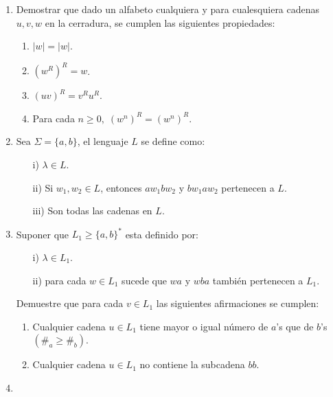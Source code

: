 \documentclass{article}
\begin{document}
\begin{enumerate}
\begin{proof}
\begin{enumerate}
\begin{eqnarray*}
        &=& |a \cdot w| + |w_{2}|
        \hspace*{0.8cm} \text{Para $u$ cadena y $b$ símbolo, se tiene que } |b \cdot u| = 1 + |u|.\\
      \end{eqnarray*}
      \hspace*{4.5cm} $\therefore \hspace*{0.5cm} |vw| = |v| + |w|$
    \end{enumerate}
  \end{proof}
\item Demostrar que dado un alfabeto cualquiera y para cualesquiera cadenas $u, v, w$ en
  la cerradura, se cumplen las siguientes propiedades:
  \begin{enumerate}
  \item $|w| = |w|$.
  \item $\left(w^{R}\right)^{R} = w$.
  \item $(uv)^{R} = v^R u^R$.
  \item Para cada $n \geq 0,\; \left(w^{n}\right)^{R} = \left(w^{n}\right)^{R}$.
  \end{enumerate}
\item Sea $\Sigma = \{a, b\}$, el lenguaje $L$ se define como:
  \begin{enumerate}
  \item[i)] $\lambda \in L$.
  \item[ii)] Si $w_1, w_2 \in L$, entonces $aw_1bw_2$ y $bw_1aw_2$ pertenecen a $L$.
  \item[iii)] Son todas las cadenas en $L$.
  \end{enumerate}
\item Suponer que $L_1 \geq \{a,b\}^{*}$ esta definido por:
  \begin{enumerate}
  \item[i)] $\lambda \in L_1$.
  \item[ii)]  para cada $w \in L_1$ sucede que $wa$ y $wba$ también pertenecen a $L_1$.
  \end{enumerate}
  Demuestre que para cada $v \in L_1$ las siguientes afirmaciones se cumplen:
  \begin{enumerate}
  \item Cualquier cadena $u \in L_1$ tiene mayor o igual número de $a$'s que de
    $b$'s $\left(\#_{a} \geq \#_{b}\right)$.
  \item Cualquier cadena $u \in L_1$ no contiene la subcadena $bb$.
  \end{enumerate}
\item 
\end{enumerate}
\end{document}
